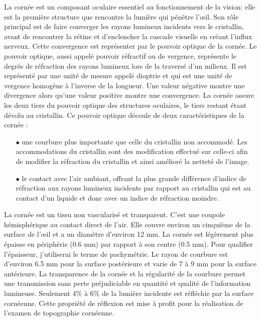 \documentclass[a4paper,12pt]{article}
\begin{document}
La cornée est un composant oculaire essentiel au fonctionnement de la vision: elle est la première structure que rencontre la lumière qui pénètre l’œil. Son rôle principal est de faire converger les rayons lumineux incidents vers le cristallin, avant de rencontrer la rétine et d'enclencher la cascade visuelle en créant l'influx nerveux. Cette convergence est représenter par le pouvoir optique de la cornée. Le pouvoir optique, aussi appelé pouvoir réfractif ou de vergence, représente le degrés de réfraction des rayons lumineux lors de la traversé d'un milieux. Il est représenté par une unité de mesure appelé dioptrie et qui est une unité de vergence homogène à l'inverse de la longueur.  Une valeur négative montre une divergence alors qu'une valeur positive montre une convergence. La cornée assure les deux tiers du pouvoir optique des structures oculaires, le tiers restant étant dévolu au cristallin. Ce pouvoir optique découle de deux caractéristiques de la cornée : \vspace{0.15cm}
\begin{itemize}\setlength{\itemsep}{1mm}
	\item[$\bullet$] une courbure plus importante que celle du cristallin non accommodé. Les accommodations du cristallin sont des modification effectué sur celle-ci afin de modifier la réfraction du cristallin et ainsi amélioré la netteté de l'image.
	\item[$\bullet$] le contact avec l'air ambiant, offrant la plus grande différence d'indice de réfraction aux rayons lumineux incidents par rapport au cristallin qui est au contact d'un liquide et donc avec un indice de réfraction moindre. 
\end{itemize}

 \vspace{0.5cm}
La cornée est un tissu non vascularisé et transparent. C'est une coupole hémisphérique au contact direct de l'air. Elle couvre environ un cinquième de la surface de l’œil et a un diamètre d'environ 12 mm. La cornée est légèrement plus épaisse en périphérie (0.6 mm) par rapport à son centre (0.5 mm). Pour qualifier l'épaisseur, j'utiliserai le terme de pachymétrie. Le rayon de courbure est d'environ 6.5 mm pour la surface postérieure et varie de 7 à 9 mm pour la surface antérieure. La transparence de la cornée et la régularité de la courbure permet une transmission sans perte préjudiciable en quantité et qualité de l'information lumineuse. Seulement 4\% à 6\% de la lumière incidente est réfléchie par la surface cornéenne. Cette propriété de réflexion est mise à profit pour la réalisation de l'examen de topographie cornéenne.
\end{document}
